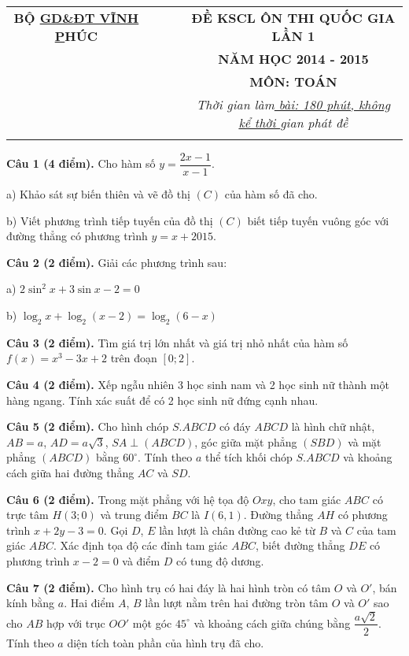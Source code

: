 \documentclass[12pt]{article}
\begin{document}
\thispagestyle{empty}
\begin{tabular}{c c c c c}
\textbf{BỘ \underline{GD\&ĐT VĨNH P}HÚC}&&&&\textbf{ĐỀ KSCL ÔN THI QUỐC GIA LẦN 1} \\
&&&&\textbf{NĂM HỌC 2014 - 2015} \\
&&&&\textbf{MÔN: TOÁN}\\
&&&&\textit{Thời gian làm\underline{ bài: 180 phút, không kể thời }gian phát đề}\\\\
\end{tabular}

\noindent\textbf{Câu 1 (4 điểm).}
Cho hàm số $y = \dfrac{{2x - 1}}{{x - 1}} $.\par
a) Khảo sát sự biến thiên và vẽ đồ thị $(C)$ của hàm số đã cho.\par
b) Viết phương trình tiếp tuyến của đồ thị $(C)$ biết tiếp tuyến vuông góc với đường thẳng có phương trình $y = x + 2015$.

\noindent\textbf{Câu 2 (2 điểm).}
Giải các phương trình sau:\par
a) $2\sin^2x + 3\sin x - 2 = 0$\par
b) $\displaystyle\log _2x + {\log _2}(x - 2) = {\log _2}(6 - x)$

\noindent\textbf{Câu 3 (2 điểm).}
Tìm giá trị lớn nhất và giá trị nhỏ nhất của hàm số $f(x) = x^3 - 3x + 2$ trên đoạn $[0;2]$.

\noindent\textbf{Câu 4 (2 điểm).}
Xếp ngẫu nhiên 3 học sinh nam và 2 học sinh nữ thành một hàng ngang. Tính xác suất để có 2 học sinh nữ đứng cạnh nhau.

\noindent\textbf{Câu 5 (2 điểm).}
Cho hình chóp $S.ABCD$ có đáy $ABCD$ là hình chữ nhật, $AB=a$, $AD=a\sqrt{3}$, $SA\perp(ABCD)$, góc giữa mặt phẳng $(SBD)$ và mặt phẳng $(ABCD)$ bằng $60^\circ$. Tính theo $a$ thể tích khối chóp $S.ABCD$ và khoảng cách giữa hai đường thẳng $AC$ và $SD$.

\noindent\textbf{Câu 6 (2 điểm).}
Trong mặt phẳng với hệ tọa độ $Oxy$, cho tam giác $ABC$ có trực tâm $H(3;0)$ và trung điểm $BC$ là $I(6,1)$. Đường thẳng $AH$ có phương trình $x + 2y - 3 = 0$. Gọi $D$, $E$ lần lượt là chân đường cao kẻ từ $B$ và $C$ của tam giác $ABC$. Xác định tọa độ các đỉnh tam giác $ABC$, biết đường thẳng $DE$ có phương trình $x - 2 = 0$ và điểm $D$ có tung độ dương.

\noindent\textbf{Câu 7 (2 điểm).}
Cho hình trụ có hai đáy là hai hình tròn có tâm $O$ và $O'$, bán kính bằng $a$. Hai điểm $A$, $B$ lần lượt nằm trên hai đường tròn tâm $O$ và $O'$ sao cho $AB$ hợp với trục $OO'$ một góc $45^\circ$ và khoảng cách giữa chúng bằng $\dfrac{a\sqrt{2}}{2}$. Tính theo $a$ diện tích toàn phần của hình trụ đã cho.
\end{document}

